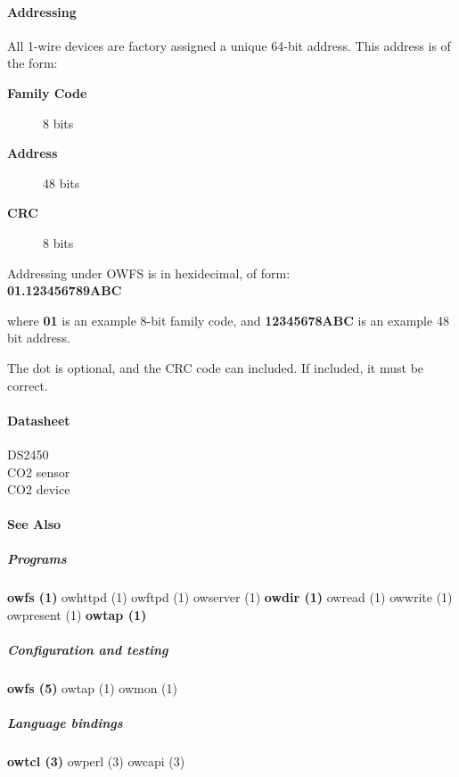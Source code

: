 \paragraph*{Addressing}
          All 1-wire devices are factory assigned a
unique 64-bit address. This address is of the form: \begin{description}
\item [\textbf{Family Code} ] 8 bits 
\item [\textbf{Address}
] 48 bits 
\item [\textbf{CRC} ] 8 bits 
\end{description}


\begin{description}
\item [Addressing under OWFS is in hexidecimal, of form: ] 
\item [\textbf{01.123456789ABC}
] 
\end{description}


where \textbf{01} is an example 8-bit family code, and \textbf{12345678ABC} is an example
48 bit address. 

The dot is optional, and the CRC code can included. If included,
it must be correct.  
\paragraph*{Datasheet}
\begin{description}
\item [DS2450 ] 

\item [CO2 sensor ]  
\item [CO2 device ] 

\end{description}

\paragraph*{See Also}

\subparagraph*{Programs}\textsf{\textbf{owfs (1)} \textsf{owhttpd (1)} \textsf{owftpd (1)} \textsf{owserver (1)}} \textsf{\textbf{owdir (1)}
\textsf{owread (1)} \textsf{owwrite (1)} \textsf{owpresent (1)}} \textsf{\textbf{owtap (1)}} 
\subparagraph*{Configuration and testing}\textsf{\textbf{owfs
(5)} \textsf{owtap (1)} \textsf{owmon (1)}} 
\subparagraph*{Language bindings}\textsf{\textbf{owtcl (3)} \textsf{owperl (3)} \textsf{owcapi (3)}}

